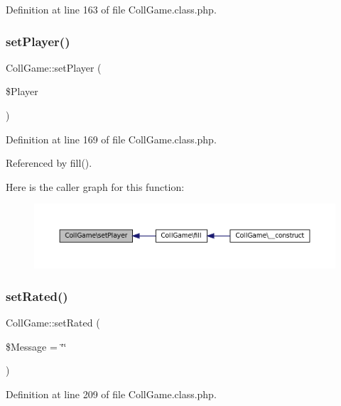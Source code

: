 Definition at line 163 of file Coll\+Game.\+class.\+php.

\mbox{\label{class_coll_game_a59f8a0778646e4a875e14613e98ae4d7}} 
\subsubsection{\texorpdfstring{set\+Player()}{setPlayer()}}
{\footnotesize\ttfamily Coll\+Game\+::set\+Player (\begin{DoxyParamCaption}\item[{}]{\$\+Player }\end{DoxyParamCaption})}



Definition at line 169 of file Coll\+Game.\+class.\+php.



Referenced by fill().

Here is the caller graph for this function\+:\nopagebreak
\begin{figure}[H]
\begin{center}
\leavevmode
\includegraphics[width=350pt]{class_coll_game_a59f8a0778646e4a875e14613e98ae4d7_icgraph}
\end{center}
\end{figure}
\mbox{\label{class_coll_game_a66a1e8f3c025110296b6cff7987e98a0}} 
\subsubsection{\texorpdfstring{set\+Rated()}{setRated()}}
{\footnotesize\ttfamily Coll\+Game\+::set\+Rated (\begin{DoxyParamCaption}\item[{}]{\$\+Message = {\ttfamily \char`\"{}\char`\"{}} }\end{DoxyParamCaption})}



Definition at line 209 of file Coll\+Game.\+class.\+php.

